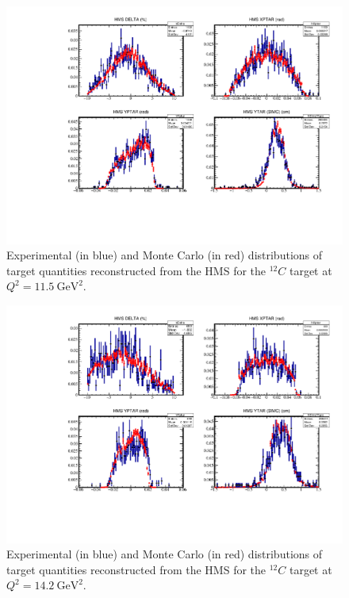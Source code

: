 \begin{figure}[!h]
    \centering
    \includegraphics[page=1,width=1.0\textwidth]{pass5_report/Report_c115.pdf}
    \caption{
            Experimental (in blue) and Monte Carlo (in red) distributions of
            target quantities reconstructed from the HMS for
            the ${}^{12}C$ target at $Q^2=\SI{11.5}{\giga\electronvolt\squared}$.
            }
    \label{fig:Report_c115.pdf}
\end{figure}


\begin{figure}[!h]
    \centering
    \includegraphics[page=1,width=1.0\textwidth]{pass5_report/Report_c143_sm.pdf}
    \caption{
            Experimental (in blue) and Monte Carlo (in red) distributions of
            target quantities reconstructed from the HMS for
            the ${}^{12}C$ target at $Q^2=\SI{14.2}{\giga\electronvolt\squared}$.
            }
    \label{fig:Report_c143_sm.pdf}
\end{figure}


